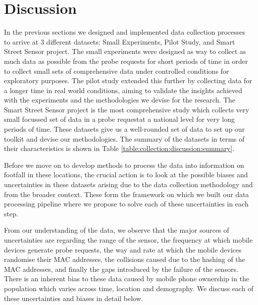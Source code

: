 \section{Discussion} \label{section:uncertainties}
In the previous sections we designed and implemented data collection processes to arrive at 3 different datasets: Small Experiments, Pilot Study, and Smart Street Sensor project. 
The small experiments were designed as way to collect as much data as possible from the probe requests for short periods of time in order to collect small sets of comprehensive data under controlled conditions for exploratory purposes.
The pilot study extended this further by collecting data for a longer time in real world conditions, aiming to validate the insights achieved with the experiments and the methodologies we devise for the research.
The Smart Street Sensor project is the most comprehensive study which collects very small focussed set of data in a probe requestat a national level for very long periods of time.
These datasets give us a well-rounded set of data to set up our toolkit and devise our methodologies.
The summary of the datasets in terms of their characteristics is shown in Table \ref{table:collection:discussion:summary}.

Before we move on to develop methods to process the data into information on footfall in these locations, the crucial action is to look at the possible biases and uncertainties in these datasets arising due to the data collection methodology and from the broader context.
These form the framework on which we built our data processing pipeline where we propose to solve each of these uncertainties in each step.

From our understanding of the data, we observe that the major sources of uncertainties are regarding the range of the sensor, the frequency at which mobile devices generate probe requests, the way and rate at which the mobile devices randomise their MAC addresses, the collisions caused due to the hashing of the MAC addresses, and finally the gaps introduced by the failure of the sensors.
There is an inherent bias to these data caused by mobile phone ownership in the population which varies across time, location and demography.
We discuss each of these uncertainties and biases in detail below.

